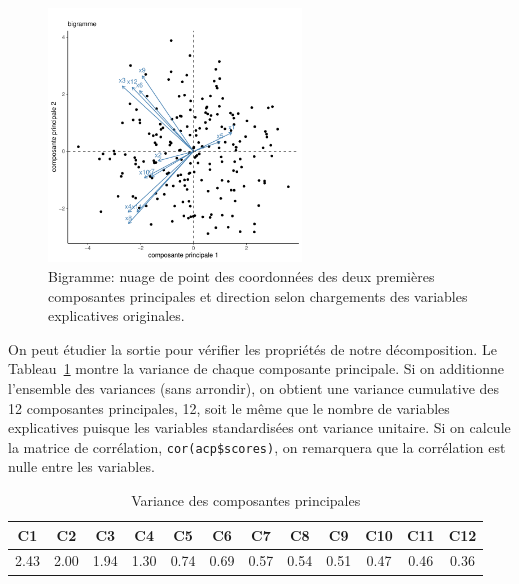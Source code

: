 \documentclass[
  11pt,
  letterpaper,
]{scrbook}
\theoremstyle{definition}
\theoremstyle{remark}
\begin{document}
\begin{figure}[ht!]

{\centering \includegraphics[width=0.6\textwidth,height=\textheight]{analysefactorielle_files/figure-pdf/fig-biplot-1.pdf}

}

\caption{\label{fig-biplot}Bigramme: nuage de point des coordonnées des
deux premières composantes principales et direction selon chargements
des variables explicatives originales.}

\end{figure}

On peut étudier la sortie pour vérifier les propriétés de notre
décomposition. Le Tableau~\ref{tbl-eigenvalues} montre la variance de
chaque composante principale. Si on additionne l'ensemble des variances
(sans arrondir), on obtient une variance cumulative des 12 composantes
principales, 12, soit le même que le nombre de variables explicatives
puisque les variables standardisées ont variance unitaire. Si on calcule
la matrice de corrélation, \texttt{cor(acp\$scores)}, on remarquera que
la corrélation est nulle entre les variables.

\hypertarget{tbl-eigenvalues}{}
\begin{table}
\caption{\label{tbl-eigenvalues}Variance des composantes principales }\tabularnewline

\centering
\begin{tabular}{cccccccccccc}
\toprule
C1 & C2 & C3 & C4 & C5 & C6 & C7 & C8 & C9 & C10 & C11 & C12\\
\midrule
2.43 & 2.00 & 1.94 & 1.30 & 0.74 & 0.69 & 0.57 & 0.54 & 0.51 & 0.47 & 0.46 & 0.36\\
\bottomrule
\end{tabular}
\end{table}
\end{document}
